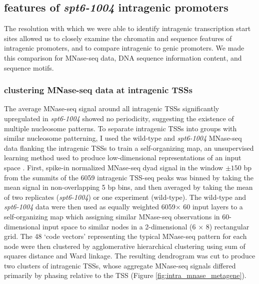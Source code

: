 \documentclass[9pt, letterpaper]{article}
\begin{document}
\subsection{features of \textit{spt6-1004} intragenic promoters}

The resolution with which we were able to identify intragenic transcription start sites allowed us to closely examine the chromatin and sequence features of intragenic promoters, and to compare intragenic to genic promoters. We made this comparison for MNase-seq data, DNA sequence information content, and sequence motifs.

\subsubsection{clustering MNase-seq data at intragenic TSSs}

The average MNase-seq signal around all intragenic TSSs significantly upregulated in \textit{spt6-1004} showed no periodicity, suggesting the existence of multiple nucleosome patterns. To separate intragenic TSSs into groups with similar nucleosome patterning, I used the wild-type and \textit{spt6-1004} MNase-seq data flanking the intragenic TSSs to train a self-organizing map, an unsupervised learning method used to produce low-dimensional representations of an input space \cite{wehrens2007}. First, spike-in normalized MNase-seq dyad signal in the window $\pm 150$ bp from the summits of the 6059 intragenic TSS-seq peaks was binned by taking the mean signal in non-overlapping 5 bp bins, and then averaged by taking the mean of two replicates (\textit{spt6-1004}) or one experiment (wild-type). The wild-type and \textit{spt6-1004} data were then used as equally weighted 6059$\times$ 60 input layers to a self-organizing map which assigning similar MNase-seq observations in 60-dimensional input space to similar nodes in a 2-dimensional (6 $\times$ 8) rectangular grid. The 48 `code vectors' representing the typical MNase-seq pattern for each node were then clustered by agglomerative hierarchical clustering using sum of squares distance and Ward linkage. The resulting dendrogram was cut to produce two clusters of intragenic TSSs, whose aggregate MNase-seq signals differed primarily by phasing relative to the TSS (Figure \ref{fig:intra_mnase_metagene}).
\end{document}
